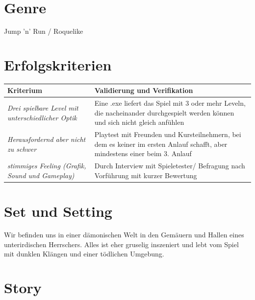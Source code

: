 \documentclass{article}
\begin{document}


	

\newpage
\section{Genre}

Jump 'n' Run / Roquelike

\vspace{1cm}
\section{Erfolgskriterien}

   \begin{table}[H]
	\centering
	\begin{tabular}{p{4cm}p{7cm}}
		\textbf{Kriterium}  & \textbf{Validierung und Verifikation} \\
		\hline
		\textit{Drei spielbare Level mit unterschiedlicher Optik}          & \textnormal{Eine .exe liefert das Spiel mit 3 oder mehr Leveln, die nacheinander durchgespielt werden können und sich nicht gleich anfühlen}            \\
		\hline
		\textit{Herausfordernd aber nicht zu schwer}       & \textnormal{Playtest mit Freunden und Kursteilnehmern, bei dem es keiner im ersten Anlauf schafft, aber mindestens einer beim 3. Anlauf} \\
		\hline
		\textit{stimmiges Feeling (Grafik, Sound und Gameplay)}        & \textnormal{Durch Interview mit Spieletester/ Befragung nach Vorführung mit kurzer Bewertung} \\
	\end{tabular}	
	\label{tbl:ktierien}
	
\end{table}


\vspace{1cm}
\section{Set und Setting}

Wir befinden uns in einer dämonischen Welt in den Gemäuern und Hallen eines unterirdischen Herrschers. Alles ist eher gruselig inszeniert und lebt vom Spiel mit dunklen Klängen und einer tödlichen Umgebung.

\vspace{1cm}
\section{Story}
\end{document}
